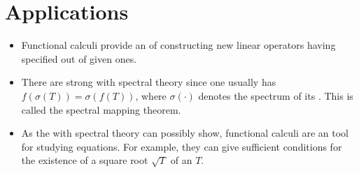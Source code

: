 \documentclass[12pt]{article}
\begin{document}
\section{Applications}
\begin{itemize}
\item Functional calculi provide an  of constructing new linear operators having specified  out of given ones.

\item There are strong  with spectral theory since one usually has $f(\sigma(T)) = \sigma(f(T))$, where $\sigma(\cdot)$ denotes the spectrum of its . This is called the spectral mapping theorem.

\item As the  with spectral theory can possibly show, functional calculi are an  tool for studying  equations. For example, they can give sufficient conditions for the existence of a square root $\sqrt{T}$ of an  $T$.
\end{itemize}
\end{document}

